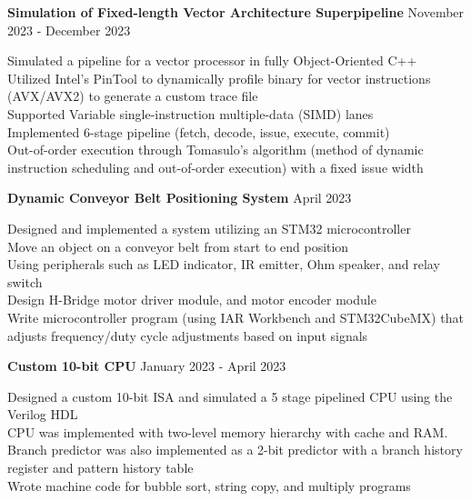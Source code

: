 \documentclass[letter,12pt]{article}
\begin{document}
\vspace{-.125cm}
\begin{tcolorbox}
[colback=gray!25,
  leftrule=0pt,
  rightrule=0pt,
  sharp corners]
\noindent\textbf{Simulation of Fixed-length Vector Architecture Superpipeline}
\hfill November 2023 - December 2023
\end{tcolorbox}
\noindent
\textbullet \- Simulated a pipeline for a vector processor in fully Object-Oriented C++\\
\textbullet \- Utilized Intel's PinTool to dynamically profile binary for vector instructions (AVX/AVX2) to generate a custom trace file\\
\textbullet \- Supported Variable single-instruction multiple-data (SIMD) lanes\\
\textbullet \- Implemented 6-stage pipeline (fetch, decode, issue, execute, commit)\\
\textbullet \- Out-of-order execution through Tomasulo's algorithm (method of dynamic
instruction scheduling and out-of-order execution)
with a fixed issue width\\

\vspace{-.5cm}
\begin{tcolorbox}
[colback=gray!25,
  leftrule=0pt,
  rightrule=0pt,
  sharp corners]
\noindent\textbf{Dynamic Conveyor Belt Positioning System} 
  \hfill April 2023 
\end{tcolorbox}
\noindent
\textbullet \- Designed and implemented a system utilizing an STM32 microcontroller \\
\textbullet \- Move an object on a conveyor belt from start to end position \\
\textbullet \- Using peripherals such as LED indicator, IR emitter, Ohm speaker, and relay switch\\
\textbullet \- Design H-Bridge motor driver module, and motor encoder module \\
\textbullet \- Write microcontroller program (using IAR Workbench and STM32CubeMX) 
that adjusts frequency/duty cycle adjustments based on input signals \\

\vspace{-.5cm}

\begin{tcolorbox}
[colback=gray!25,
  leftrule=0pt,
  rightrule=0pt,
  sharp corners]
\textbf{Custom 10-bit CPU} 
\hfill January 2023 - April 2023 
\end{tcolorbox}
\noindent
\textbullet \- Designed a custom 10-bit ISA and simulated a 5 stage pipelined CPU using the Verilog HDL \\
\textbullet \- CPU was implemented with two-level memory hierarchy with cache and RAM. \\
\textbullet \- Branch predictor was also implemented as a 2-bit predictor with a branch history register and
pattern history table\\
\textbullet \- Wrote machine code for bubble sort, string copy, and multiply programs
\vspace{-.75cm}
\end{document}
